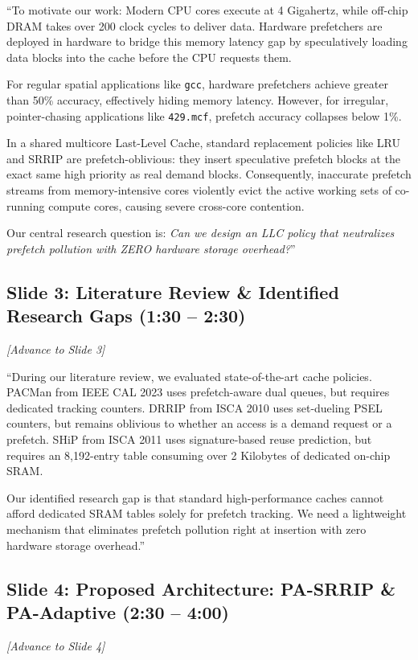 \documentclass[11pt, a4paper]{article}
\begin{document}
``To motivate our work: Modern CPU cores execute at 4 Gigahertz, while off-chip DRAM takes over 200 clock cycles to deliver data. Hardware prefetchers are deployed in hardware to bridge this memory latency gap by speculatively loading data blocks into the cache before the CPU requests them.

For regular spatial applications like \texttt{gcc}, hardware prefetchers achieve greater than 50\% accuracy, effectively hiding memory latency. However, for irregular, pointer-chasing applications like \texttt{429.mcf}, prefetch accuracy collapses below 1\%.

In a shared multicore Last-Level Cache, standard replacement policies like LRU and SRRIP are prefetch-oblivious: they insert speculative prefetch blocks at the exact same high priority as real demand blocks. Consequently, inaccurate prefetch streams from memory-intensive cores violently evict the active working sets of co-running compute cores, causing severe cross-core contention.

Our central research question is: \textit{Can we design an LLC policy that neutralizes prefetch pollution with ZERO hardware storage overhead?}''

\subsection{Slide 3: Literature Review \& Identified Research Gaps (1:30 -- 2:30)}
\textit{[Advance to Slide 3]}

``During our literature review, we evaluated state-of-the-art cache policies. PACMan from IEEE CAL 2023 uses prefetch-aware dual queues, but requires dedicated tracking counters. DRRIP from ISCA 2010 uses set-dueling PSEL counters, but remains oblivious to whether an access is a demand request or a prefetch. SHiP from ISCA 2011 uses signature-based reuse prediction, but requires an 8,192-entry table consuming over 2 Kilobytes of dedicated on-chip SRAM.

Our identified research gap is that standard high-performance caches cannot afford dedicated SRAM tables solely for prefetch tracking. We need a lightweight mechanism that eliminates prefetch pollution right at insertion with zero hardware storage overhead.''

\subsection{Slide 4: Proposed Architecture: PA-SRRIP \& PA-Adaptive (2:30 -- 4:00)}
\textit{[Advance to Slide 4]}
\end{document}
